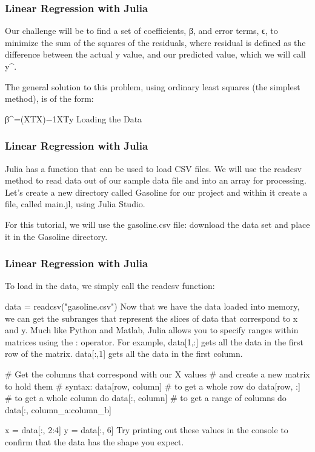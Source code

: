 \begin{frame}
\frametitle{Linear Regression with Julia}
\vscpace{-1cm}
\large
\begin{itemize}
Our challenge will be to find a set of coefficients, β, and error terms, ϵ, to minimize the sum of the squares of the residuals, where residual is defined as the difference between the actual y value, and our predicted value, which we will call y^.

The general solution to this problem, using ordinary least squares (the simplest method), is of the form:

β^=(XTX)−1XTy
Loading the Data
\end{itemize}
\end{frame}
\begin{frame}
\frametitle{Linear Regression with Julia}
\vscpace{-1cm}
\large
\begin{itemize}
Julia has a function that can be used to load CSV files. We will use the readcsv method to read data out of our sample data file and into an array for processing. Let's create a new directory called Gasoline for our project and within it create a file, called main.jl, using Julia Studio.

For this tutorial, we will use the gasoline.csv file:  download the data set and place it in the Gasoline directory.
\end{itemize}
\end{frame}
\begin{frame}
\frametitle{Linear Regression with Julia}
\vscpace{-1cm}
\large
\begin{itemize}
To load in the data, we simply call the readcsv function:

data = readcsv("gasoline.csv")
Now that we have the data loaded into memory, we can get the subranges that represent the slices of data that correspond to x and y. Much like Python and Matlab, Julia allows you to specify ranges within matrices using the : operator. For example, data[1,:] gets all the data in the first row of the matrix. data[:,1] gets all the data in the first column.

# Get the columns that correspond with our X values 
# and create a new matrix to hold them
# syntax: data[row, column]
# to get a whole row do data[row, :]
# to get a whole column do data[:, column]
# to get a range of columns do data[:, column_a:column_b]
 
x = data[:, 2:4]
y = data[:, 6]
Try printing out these values in the console to confirm that the data has the shape you expect.
\end{itemize}
\end{frame}
